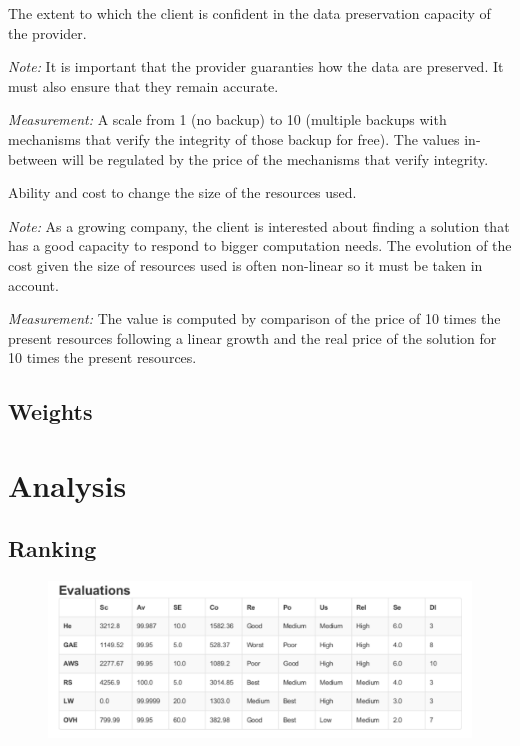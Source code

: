 \documentclass[a4paper,11pt]{article}
\begin{document}
\begin{description}[parsep=10pt,listparindent=\parindent,labelindent=\parindent,font=$\bullet$\ ]
  \item[Data Integrity:] The extent to which the client is confident in the data preservation capacity of the provider.
    \par \emph{Note:} It is important that the provider guaranties how the data are preserved. It must also ensure that they remain accurate.
    \par \emph{Measurement:} A scale from 1 (no backup) to 10 (multiple backups with mechanisms that verify the integrity of those backup for free). The values in-between will be regulated by the price of the mechanisms that verify integrity.

  \item[Scalability:] Ability and cost to change the size of the resources used.
    \par \emph{Note:} As a growing company, the client is interested about finding a solution that has a good capacity to respond to bigger computation needs. The evolution of the cost given the size of resources used is often non-linear so it must be taken in account.
    \par \emph{Measurement:} The value is computed by comparison of the price of 10 times the present resources following a linear growth and the real price of the solution for 10 times the present resources.

\end{description}


\subsection{Weights}


\section{Analysis}

\subsection{Ranking}

\begin{figure}[h]
  \includegraphics[width=\textwidth]{img/Result/evaluation.pdf}
\end{figure}
\end{document}
